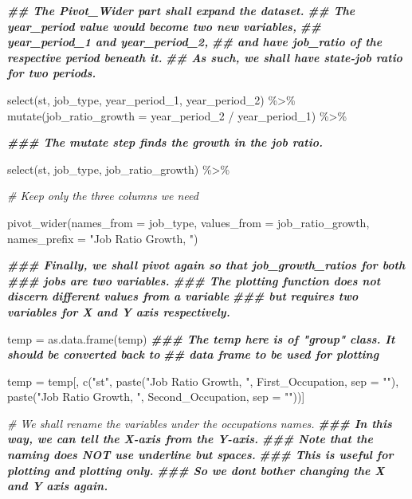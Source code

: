 \documentclass[
]{article}
\newenvironment{Shaded}{\begin{snugshade}}{\end{snugshade}}
\newcommand{\AttributeTok}[1]{\textcolor[rgb]{0.77,0.63,0.00}{#1}}
\newcommand{\CommentTok}[1]{\textcolor[rgb]{0.56,0.35,0.01}{\textit{#1}}}
\newcommand{\DocumentationTok}[1]{\textcolor[rgb]{0.56,0.35,0.01}{\textbf{\textit{#1}}}}
\newcommand{\FunctionTok}[1]{\textcolor[rgb]{0.00,0.00,0.00}{#1}}
\newcommand{\NormalTok}[1]{#1}
\newcommand{\OtherTok}[1]{\textcolor[rgb]{0.56,0.35,0.01}{#1}}
\newcommand{\SpecialCharTok}[1]{\textcolor[rgb]{0.00,0.00,0.00}{#1}}
\newcommand{\StringTok}[1]{\textcolor[rgb]{0.31,0.60,0.02}{#1}}
\begin{document}
\begin{Shaded}
\begin{Highlighting}[]
    \DocumentationTok{\#\# The Pivot\_Wider part shall expand the dataset.}
    \DocumentationTok{\#\# The year\_period value would become two new variables, }
    \DocumentationTok{\#\# year\_period\_1 and year\_period\_2,}
    \DocumentationTok{\#\# and have job\_ratio of the respective period beneath it.}
    \DocumentationTok{\#\# As such, we shall have state{-}job ratio for two periods.}
    
    \FunctionTok{select}\NormalTok{(st, job\_type, year\_period\_1, year\_period\_2) }\SpecialCharTok{\%\textgreater{}\%}
    \FunctionTok{mutate}\NormalTok{(}\AttributeTok{job\_ratio\_growth =}\NormalTok{ year\_period\_2 }\SpecialCharTok{/}\NormalTok{ year\_period\_1) }\SpecialCharTok{\%\textgreater{}\%}
    
    \DocumentationTok{\#\#\# The mutate step finds the growth in the job ratio.}
    
    \FunctionTok{select}\NormalTok{(st, job\_type, job\_ratio\_growth) }\SpecialCharTok{\%\textgreater{}\%}
    
    \CommentTok{\# Keep only the three columns we need}
    
    \FunctionTok{pivot\_wider}\NormalTok{(}\AttributeTok{names\_from =}\NormalTok{ job\_type, }\AttributeTok{values\_from =}\NormalTok{ job\_ratio\_growth,}
                \AttributeTok{names\_prefix =} \StringTok{"Job Ratio Growth, "}\NormalTok{)}
  
  \DocumentationTok{\#\#\# Finally, we shall pivot again so that job\_growth\_ratios for both}
  \DocumentationTok{\#\#\# jobs are two variables.}
  \DocumentationTok{\#\#\# The plotting function does not discern different values from a variable }
  \DocumentationTok{\#\#\# but requires two variables for X and Y axis respectively.}
  
\NormalTok{  temp }\OtherTok{=} \FunctionTok{as.data.frame}\NormalTok{(temp)}
  \DocumentationTok{\#\#\# The temp here is of "group" class. It should be converted back to }
  \DocumentationTok{\#\# data frame to be used for plotting}
  
  
\NormalTok{  temp }\OtherTok{=}\NormalTok{ temp[, }\FunctionTok{c}\NormalTok{(}\StringTok{"st"}\NormalTok{, }\FunctionTok{paste}\NormalTok{(}\StringTok{"Job Ratio Growth, "}\NormalTok{, First\_Occupation, }\AttributeTok{sep =} \StringTok{""}\NormalTok{),}
                  \FunctionTok{paste}\NormalTok{(}\StringTok{"Job Ratio Growth, "}\NormalTok{, Second\_Occupation, }\AttributeTok{sep =} \StringTok{""}\NormalTok{))]}
  
  \CommentTok{\# We shall rename the variables under the occupations\textquotesingle{} names.}
  \DocumentationTok{\#\#\# In this way, we can tell the X{-}axis from the Y{-}axis.}
  \DocumentationTok{\#\#\# Note that the naming does NOT use underline but spaces. }
  \DocumentationTok{\#\#\# This is useful for plotting and plotting only.}
  \DocumentationTok{\#\#\# So we don\textquotesingle{}t bother changing the X and Y axis again.}
    

\end{Highlighting}
\end{Shaded}
\end{document}
